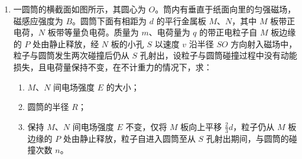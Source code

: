 \documentclass[\gkver]{gaokaozhenti}
\begin{document}
\begin{enumerate}
{由牛顿第二定律得

$a=\frac{F_{f}}{m}$⑤

由匀变速直线运动公式得

$v^{2}=2ax_{2}$⑥

以物块运动的方向为正方向，由动量定理，得

$-F_{f}t=0-mv$⑦

代入数据，解得：$t=2\Us$⑧
}

\item
一圆筒的横截面如图所示，其圆心为 $O$。筒内有垂直于纸面向里的匀强磁场，磁感应强度为 $B$。圆筒下面有相距为 $d$ 的平行金属板 $M$、$N$，其中 $M$ 板带正电荷，$N$ 板带等量负电荷。质量为 $m$、电荷量为 $q$ 的带正电粒子自 $M$ 板边缘的 $P$ 处由静止释放，经 $N$ 板的小孔 $S$ 以速度 $v$ 沿半径 $SO$ 方向射入磁场中，粒子与圆筒发生两次碰撞后仍从 $S$ 孔射出，设粒子与圆筒碰撞过程中没有动能损失，且电荷量保持不变，在不计重力的情况下，求：
\begin{enumerate}
	\item
	$M$、$N$ 间电场强度 $E$ 的大小；
	\item
	圆筒的半径 $R$；
	\item
	保持 $M$、$N$ 间电场强度 $E$ 不变，仅将 $M$ 板向上平移 $\frac{2}{3}d$，粒子仍从 $M$ 板边缘的 $P$ 处由静止释放，粒子自进入圆筒至从 $S$ 孔射出期间，与圆筒的碰撞次数 $n$。
\end{enumerate}


\end{enumerate}
\end{document}
